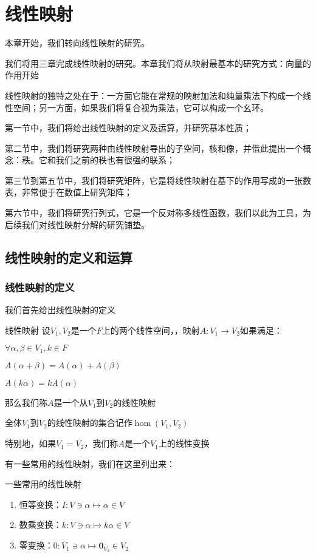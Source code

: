 \documentclass[12pt, a4paper, oneside, UTF8]{ctexbook}
\begin{document}
% 
\else
\fi
\chapter{线性映射}
	本章开始，我们转向线性映射的研究。

	我们将用三章完成线性映射的研究。本章我们将从映射最基本的研究方式：向量的作用开始

	线性映射的独特之处在于：一方面它能在常规的映射加法和纯量乘法下构成一个线性空间；另一方面，如果我们将复合视为乘法，它可以构成一个幺环。

	第一节中，我们将给出线性映射的定义及运算，并研究基本性质；
	
	第二节中，我们将研究两种由线性映射导出的子空间，核和像，并借此提出一个概念：秩。它和我们之前的秩也有很强的联系；

	第三节到第五节中，我们将研究矩阵，它是将线性映射在基下的作用写成的一张数表，非常便于在数值上研究矩阵；

	第六节中，我们将研究行列式，它是一个反对称多线性函数，我们以此为工具，为后续我们对线性映射分解的研究铺垫。
	\section{线性映射的定义和运算}
		\subsection{线性映射的定义}
			我们首先给出线性映射的定义
			\begin{defn}{线性映射}{}
				设$V_1,V_2$是一个$F$上的两个线性空间，，映射$A:V_1 \to V_2$如果满足：

				$\forall \alpha ,\beta \in V_1,k \in F$

				$A(\alpha+\beta )=A(\alpha )+A(\beta )$

				$A(k\alpha )=kA(\alpha )$

				那么我们称$A$是一个从$V_1$到$V_2$的线性映射

				全体$V_1$到$V_2$的线性映射的集合记作$\hom (V_1,V_2)$

				特别地，如果$V_1=V_2$，我们称$A$是一个$V_1$上的线性变换
			\end{defn}
			有一些常用的线性映射，我们在这里列出来：
			\begin{defn}{一些常用的线性映射}{}
				\begin{enumerate}
					\item 恒等变换：$I:V \ni \alpha \mapsto \alpha \in V$
					\item 数乘变换：$k:V \ni \alpha \mapsto k\alpha \in V$
					\item 零变换：$0:V_1 \ni \alpha \mapsto \mathbf{0}_{V_2} \in V_2$
				\end{enumerate}
			\end{defn}
\end{document}
